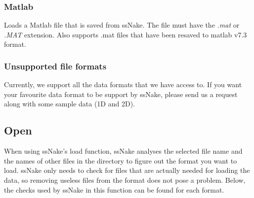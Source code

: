 \documentclass[11pt,a4paper]{article}
\begin{document}
\subsubsection*{Matlab}
Loads a Matlab file that is saved from ssNake. The file must have the \textit{.mat} or \textit{.MAT} extension. Also supports .mat files that have been resaved to matlab v7.3 format.

\subsubsection*{Unsupported file formats}
Currently, we support all the data formats that we have access to. If you want your favourite data format to be support by ssNake, please send us a request along with some sample data (1D and 2D).

\subsection{Open}
When using ssNake's load function, ssNake analyses the selected file name and the names of other files in the directory to figure out the format you want to load. ssNake only needs to check for files that are actually needed for loading the data, so removing useless files from the format does not pose a problem. Below, the checks used by ssNake in this function can be found for each format.
\end{document}
